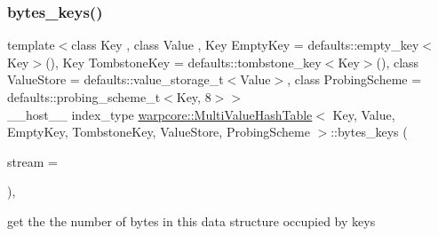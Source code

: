 \subsubsection{\texorpdfstring{bytes\+\_\+keys()}{bytes\_keys()}}
{\footnotesize\ttfamily template$<$class Key , class Value , Key Empty\+Key = defaults\+::empty\+\_\+key$<$\+Key$>$(), Key Tombstone\+Key = defaults\+::tombstone\+\_\+key$<$\+Key$>$(), class Value\+Store  = defaults\+::value\+\_\+storage\+\_\+t$<$\+Value$>$, class Probing\+Scheme  = defaults\+::probing\+\_\+scheme\+\_\+t$<$\+Key, 8$>$$>$ \\
\+\_\+\+\_\+host\+\_\+\+\_\+ index\+\_\+type \hyperlink{classwarpcore_1_1MultiValueHashTable}{warpcore\+::\+Multi\+Value\+Hash\+Table}$<$ Key, Value, Empty\+Key, Tombstone\+Key, Value\+Store, Probing\+Scheme $>$\+::bytes\+\_\+keys (\begin{DoxyParamCaption}\item[{cuda\+Stream\+\_\+t}]{stream = {} }\end{DoxyParamCaption})\hspace{0.3cm}{\ttfamily [inline]}, {\ttfamily [noexcept]}}



get the the number of bytes in this data structure occupied by keys 



